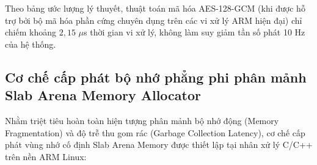 \begin{table}[H]
\centering
\caption{Ước lượng chi phí tính toán lý thuyết và mức độ an toàn của lớp mã hóa dữ liệu bám bắt}
\label{tab:cyber-security-overhead-metrics}
\end{table}

Theo bảng ước lượng lý thuyết, thuật toán mã hóa AES-128-GCM (khi được hỗ trợ bởi bộ mã hóa phần cứng chuyên dụng trên các vi xử lý ARM hiện đại) chỉ chiếm khoảng $2{,}15$ $\mu$s thời gian vi xử lý, không làm suy giảm tần số phát 10 Hz của hệ thống.

\subsection{Cơ chế cấp phát bộ nhớ phẳng phi phân mảnh Slab Arena Memory Allocator}

\hspace{0.5cm} Nhằm triệt tiêu hoàn toàn hiện tượng phân mảnh bộ nhớ động (Memory Fragmentation) và độ trễ thu gom rác (Garbage Collection Latency), cơ chế cấp phát vùng nhớ cố định Slab Arena Memory được thiết lập tại nhân xử lý C/C++ trên nền ARM Linux:

